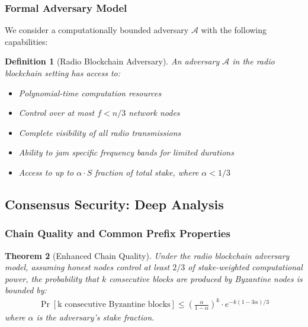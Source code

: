 \documentclass[11pt,a4paper]{article}
\newtheorem{theorem}{Theorem}[section]
\newtheorem{definition}[theorem]{Definition}
\begin{document}
\subsubsection{Formal Adversary Model}

We consider a computationally bounded adversary $\mathcal{A}$ with the following capabilities:

\begin{definition}[Radio Blockchain Adversary]
An adversary $\mathcal{A}$ in the radio blockchain setting has access to:
\begin{itemize}
\item Polynomial-time computation resources
\item Control over at most $f < n/3$ network nodes
\item Complete visibility of all radio transmissions
\item Ability to jam specific frequency bands for limited durations
\item Access to up to $\alpha \cdot S$ fraction of total stake, where $\alpha < 1/3$
\end{itemize}
\end{definition}

\subsection{Consensus Security: Deep Analysis}

\subsubsection{Chain Quality and Common Prefix Properties}

\begin{theorem}[Enhanced Chain Quality]
Under the radio blockchain adversary model, assuming honest nodes control at least $2/3$ of stake-weighted computational power, the probability that $k$ consecutive blocks are produced by Byzantine nodes is bounded by:
\begin{align}
\Pr[\text{k consecutive Byzantine blocks}] \leq \left(\frac{\alpha}{1-\alpha}\right)^k \cdot e^{-k(1-3\alpha)/3}
\end{align}
where $\alpha$ is the adversary's stake fraction.
\end{theorem}
\end{document}
